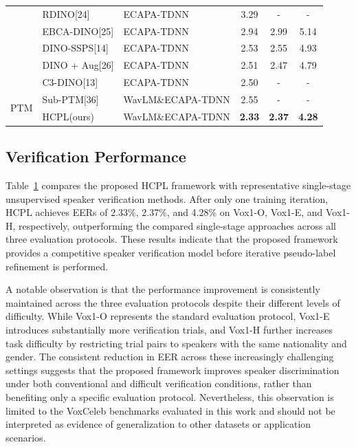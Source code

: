 \documentclass[lettersize,journal]{IEEEtran}
\begin{document}
\begin{table}[t]
\begin{tabular}{l l l  c c c}
        &RDINO[24]&ECAPA-TDNN& 3.29 & - & -   \\
        &EBCA-DINO[25]&ECAPA-TDNN& 2.94 &2.99  &  5.14  \\
        &DINO-SSPS[14]&ECAPA-TDNN& 2.53 &2.55  &  4.93  \\
        &DINO + Aug[26]&ECAPA-TDNN& 2.51 &2.47  &  4.79  \\
        &C3-DINO[13]&ECAPA-TDNN& 2.50& - &-    \\
        \hline
        \multirow{2}{*}{PTM}
        &Sub-PTM[36]&WavLM\&ECAPA-TDNN& 2.55& - &-    \\
        &HCPL(ours) & WavLM\&ECAPA-TDNN  & \textbf{2.33} & \textbf{2.37} & \textbf{4.28}   \\
        \hline
    \end{tabular}
    \label{tab:single-stage comparison}
\end{table}
\FloatBarrier 
\subsection{Verification Performance}

Table~\ref{tab:single-stage comparison} compares the proposed HCPL framework with representative single-stage unsupervised speaker verification methods. After only one training iteration, HCPL achieves EERs of 2.33\%, 2.37\%, and 4.28\% on Vox1-O, Vox1-E, and Vox1-H, respectively, outperforming the compared single-stage approaches across all three evaluation protocols. These results indicate that the proposed framework provides a competitive speaker verification model before iterative pseudo-label refinement is performed.

A notable observation is that the performance improvement is consistently maintained across the three evaluation protocols despite their different levels of difficulty. While Vox1-O represents the standard evaluation protocol, Vox1-E introduces substantially more verification trials, and Vox1-H further increases task difficulty by restricting trial pairs to speakers with the same nationality and gender. The consistent reduction in EER across these increasingly challenging settings suggests that the proposed framework improves speaker discrimination under both conventional and difficult verification conditions, rather than benefiting only a specific evaluation protocol. Nevertheless, this observation is limited to the VoxCeleb benchmarks evaluated in this work and should not be interpreted as evidence of generalization to other datasets or application scenarios.
\end{document}
